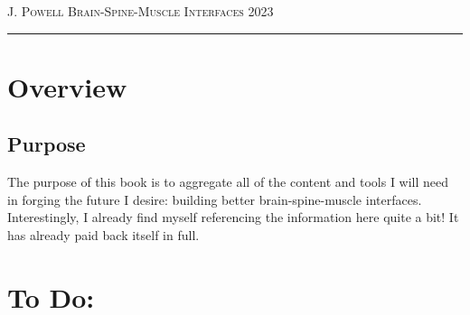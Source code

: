 \documentclass[12pt]{report}
\begin{document}
\pagebreak




{\scshape J. Powell} \hfill {\scshape \large Brain-Spine-Muscle Interfaces} \hfill {\scshape 2023}
 
\smallskip

\hrule
\bigskip
\normalsize 



\section{Overview}

\subsection{Purpose}
The purpose of this book is to aggregate all of the content and tools I will need in forging the future I desire: building better brain-spine-muscle interfaces. Interestingly, I already find myself referencing the information here quite a bit! It has already paid back itself in full.



\section{To Do:}
\end{document}
